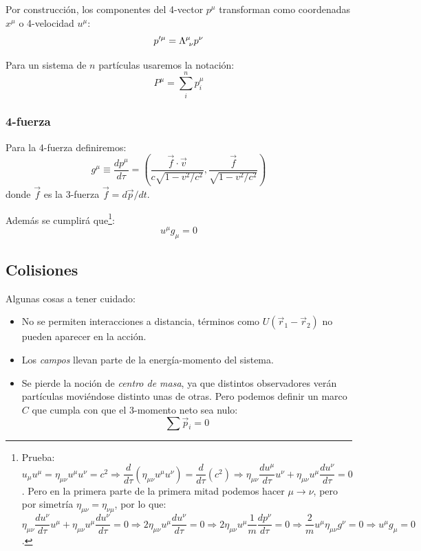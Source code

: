 \documentclass[]{article}
\numberwithin{equation}{section}
\begin{document}
Por construcción, los componentes del 4-vector \(p^\mu\) transforman como coordenadas \(x^\mu\) o 4-velocidad \(u^\mu\):
\begin{equation}
	p'^\mu = \LambdaMuNu p^\nu
\end{equation}

Para un sistema de \(n\) partículas usaremos la notación:
\begin{equation}
	P^\mu = \sum_i^n p^\mu_i
\end{equation}

\subsubsection{4-fuerza}
Para la 4-fuerza definiremos:
\begin{equation}
	g^\mu \equiv \frac{dp^\mu}{d\tau} = \left(\dfrac{\vec{f}\cdot\vec{v}}{c\sqrt{1 - v^2/c^2}}, \dfrac{\vec{f}}{\sqrt{1 - v^2/c^2}} \right) 
\end{equation}
donde \(\vec{f}\) es la 3-fuerza \(\vec{f}=d\vec{p}/dt\).

Además se cumplirá que\footnote{Prueba: \(u_\mu u^\mu = \eta_{\mu\nu}u^\mu u^\nu = c^2 \Rightarrow \dfrac{d}{d\tau}(\eta_{\mu\nu}u^\mu u^\nu) = \dfrac{d}{d\tau}(c^2) \Rightarrow \eta_{\mu\nu}\dfrac{du^\mu}{d\tau}u^\nu + \eta_{\mu\nu}u^\mu\dfrac{du^\nu}{d\tau} = 0\). Pero en la primera parte de la primera mitad podemos hacer \(\mu\rightarrow\nu\), pero por simetría \(\eta_{\mu\nu}=\eta_{\nu\mu}\), por lo que: \(\eta_{\mu\nu}\dfrac{du^\nu}{d\tau}u^\mu + \eta_{\mu\nu}u^\mu\dfrac{du^\nu}{d\tau} = 0 \Rightarrow 2\eta_{\mu\nu}u^\mu\dfrac{du^\nu}{d\tau} = 0 \Rightarrow 2\eta_{\mu\nu}u^\mu\dfrac{1}{m}\dfrac{dp^\nu}{d\tau} = 0 \Rightarrow \dfrac{2}{m} u^\mu \eta_{\mu\nu} g^\nu = 0 \Rightarrow u^\mu g_\mu = 0\).}:
\begin{equation}
	u^\mu g_\mu = 0
\end{equation}

\subsection{Colisiones}
Algunas cosas a tener cuidado:
\begin{itemize}
	\item No se permiten interacciones a distancia, términos como \(U(\vec{r}_1 - \vec{r}_2)\) no pueden aparecer en la acción.
	\item Los \textit{campos} llevan parte de la energía-momento del sistema.
	\item Se pierde la noción de \textit{centro de masa}, ya que distintos observadores verán partículas  moviéndose distinto unas de otras. Pero podemos definir un marco \(C\) que cumpla con que el 3-momento neto sea nulo:
	\begin{equation*}
		\sum \vec{p}_i = 0
	\end{equation*}
\end{itemize}
\end{document}
